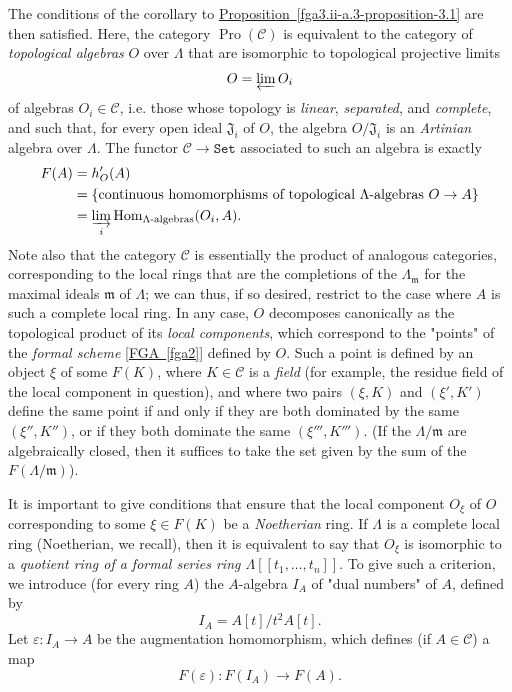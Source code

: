   The conditions of the corollary to
  \hyperref[fga3.ii-a.3-proposition-3.1]{Proposition~\ref*{fga3.ii-a.3-proposition-3.1}} are then satisfied.
  Here, the category \(\operatorname {Pro}(\mathcal {C})\) is equivalent to the category of \emph{topological algebras} \(O\) over \(\Lambda \) that are isomorphic to topological projective limits
  \[     O     = \varprojlim  O_i   \]
  of algebras \(O_i\in \mathcal {C}\), i.e. those whose topology is \emph{linear}, \emph{separated}, and \emph{complete}, and such that, for every open ideal \(\mathfrak {J}_i\) of \(O\), the algebra \(O/\mathfrak {J}_i\) is an \emph{Artinian} algebra over \(\Lambda \).
  The functor \(\mathcal {C}\to \mathtt {Set}\) associated to such an algebra is exactly
  \[     \begin {aligned}       F(A)       &= h'_{O}(A)     \\&= \{\text {continuous homomorphisms of topological }\Lambda \text {-algebras }O\to  A\}     \\&= \varinjlim _i \operatorname {Hom}_{\Lambda \text {-algebras}}(O_i,A).     \end {aligned}   \]
  Note also that the category \(\mathcal {C}\) is essentially the product of analogous categories, corresponding to the local rings that are the completions of the \(\Lambda _{\mathfrak {m}}\) for the maximal ideals \(\mathfrak {m}\) of \(\Lambda \);
  we can thus, if so desired, restrict to the case where \(A\) is such a complete local ring.
  In any case, \(O\) decomposes canonically as the topological product of its \emph{local components}, which correspond to the "points" of the \emph{formal scheme} [\hyperref[fga2]{FGA~\ref*{fga2}}] defined by \(O\).
  Such a point is defined by an object \(\xi \) of some \(F(K)\), where \(K\in \mathcal {C}\) is a \emph{field} (for example, the residue field of the local component in question), and where two pairs \((\xi ,K)\) and \((\xi ',K')\) define the same point if and only if they are both dominated by the same \((\xi '',K'')\), or if they both dominate the same \((\xi ''',K''')\).
  (If the \({\Lambda }/\mathfrak {m}\) are algebraically closed, then it suffices to take the set given by the sum of the \(F({\Lambda }/\mathfrak {m})\)).\par{}It is important to give conditions that ensure that the local component \(O_\xi \) of \(O\) corresponding to some \(\xi \in  F(K)\) be a \emph{Noetherian} ring.
  If \(\Lambda \) is a complete local ring (Noetherian, we recall), then it is equivalent to say that \(O_\xi \) is isomorphic to a \emph{quotient ring of a formal series ring \(\Lambda [{[t_1,\ldots ,t_n]}]\)}.
  To give such a criterion, we introduce (for every ring \(A\)) the \(A\)-algebra \(I_A\) of "dual numbers" of \(A\), defined by
  \[     I_A     = A[t]/t^2A[t].   \]
  Let \(\varepsilon \colon  I_A\to  A\) be the augmentation homomorphism, which defines (if \(A\in \mathcal {C}\)) a map
  \[     F(\varepsilon )\colon  F(I_A) \to  F(A).   \]
  
